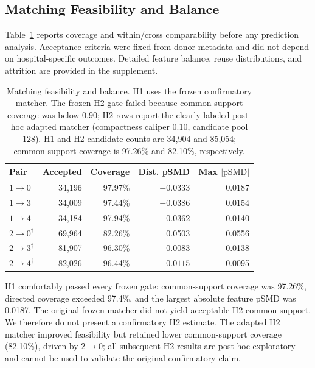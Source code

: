 \documentclass[notspecified,article,submit,moreauthors]{Definitions/mdpi}
\begin{document}
\subsection{Matching Feasibility and Balance}

Table~\ref{tab:matching_balance} reports coverage and within/cross
comparability before any prediction analysis. Acceptance criteria were fixed
from donor metadata and did not depend on hospital-specific outcomes. Detailed
feature balance, reuse distributions, and attrition are provided in the
supplement.

\begin{table}[H]
\caption{Matching feasibility and balance. H1 uses the frozen confirmatory
matcher. The frozen H2 gate failed because common-support coverage was below
0.90; H2 rows report the clearly labeled post-hoc adapted matcher (compactness
caliper 0.10, candidate pool 128). H1 and H2 candidate counts are 34,904 and
85,054; common-support coverage is 97.26\% and 82.10\%, respectively.}
\label{tab:matching_balance}
\centering
\scriptsize
\setlength{\tabcolsep}{2.4pt}
\begin{tabular}{@{}lrrrr@{}}
\toprule
Pair & Accepted & Coverage & Dist. pSMD & Max $|\mathrm{pSMD}|$ \\
\midrule
$1\rightarrow0$ & 34,196 & 97.97\% & $-0.0333$ & 0.0187 \\
$1\rightarrow3$ & 34,009 & 97.44\% & $-0.0386$ & 0.0154 \\
$1\rightarrow4$ & 34,184 & 97.94\% & $-0.0362$ & 0.0140 \\
\midrule
$2\rightarrow0^\dagger$ & 69,964 & 82.26\% & 0.0503 & 0.0556 \\
$2\rightarrow3^\dagger$ & 81,907 & 96.30\% & $-0.0083$ & 0.0138 \\
$2\rightarrow4^\dagger$ & 82,026 & 96.44\% & $-0.0115$ & 0.0095 \\
\bottomrule
\end{tabular}
\end{table}

H1 comfortably passed every frozen gate: common-support coverage was 97.26\%,
directed coverage exceeded 97.4\%, and the largest absolute feature pSMD was
0.0187. The original frozen matcher did not yield acceptable H2 common
support. We therefore do not present a confirmatory H2 estimate. The adapted
H2 matcher improved feasibility but retained lower common-support coverage
(82.10\%), driven by $2\rightarrow0$; all subsequent H2 results are post-hoc
exploratory and cannot be used to validate the original confirmatory claim.
\end{document}
